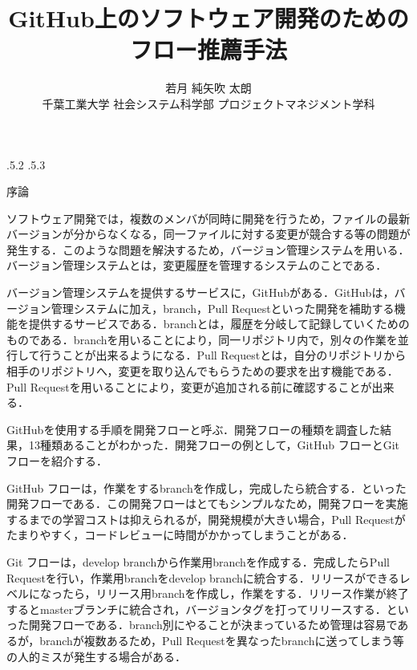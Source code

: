 \documentclass[uplatex,twocolumn]{jsarticle}
\title{\vspace{-10mm}GitHub上のソフトウェア開発のためのフロー推薦手法 \footnotemark[0]}
\author{\large{若月 純\footnotemark[2]\qquad 矢吹 太朗}\\千葉工業大学 社会システム科学部 プロジェクトマネジメント学科\footnotemark[3]}
\date{}%
\makeatletter
\renewcommand{\section}{%
    \if@slide\clearpage\fi
    \@startsection{section}{1}{\z@}%
    {\Cvs \@plus.5\Cdp \@minus.2\Cdp}%
    {.5\Cvs \@plus.3\Cdp}%
    {\normalfont\raggedright}}
\makeatother
\begin{document}
\twocolumn[\maketitle]
\begingroup
\def\thefootnote{\fnsymbol{footnote}}
\endgroup

\section{序論}

ソフトウェア開発では，複数のメンバが同時に開発を行うため，ファイルの最新バージョンが分からなくなる，同一ファイルに対する変更が競合する等の問題が発生する．このような問題を解決するため，バージョン管理システムを用いる．バージョン管理システムとは，変更履歴を管理するシステムのことである\cite{ikeda2014}．

バージョン管理システムを提供するサービスに，GitHubがある．GitHubは，バージョン管理システムに加え，branch，Pull Requestといった開発を補助する機能を提供するサービスである．branchとは，履歴を分岐して記録していくためのものである．branchを用いることにより，同一リポジトリ内で，別々の作業を並行して行うことが出来るようになる．Pull Requestとは，自分のリポジトリから相手のリポジトリへ，変更を取り込んでもらうための要求を出す機能である．Pull Requestを用いることにより，変更が追加される前に確認することが出来る．

GitHubを使用する手順を開発フローと呼ぶ．開発フローの種類を調査した結果，13種類あることがわかった．開発フローの例として，GitHub フローとGit フローを紹介する．

GitHub フローは，作業をするbranchを作成し，完成したら統合する．といった開発フローである．この開発フローはとてもシンプルなため，開発フローを実施するまでの学習コストは抑えられるが，開発規模が大きい場合，Pull Requestがたまりやすく，コードレビューに時間がかかってしまうことがある．

Git フローは，develop branchから作業用branchを作成する．完成したらPull Requestを行い，作業用branchをdevelop branchに統合する．リリースができるレベルになったら，リリース用branchを作成し，作業をする．リリース作業が終了するとmasterブランチに統合され，バージョンタグを打ってリリースする．といった開発フローである．branch別にやることが決まっているため管理は容易であるが，branchが複数あるため，Pull Requestを異なったbranchに送ってしまう等の人的ミスが発生する場合がある\cite{ohtsuka2014}．
\end{document}

